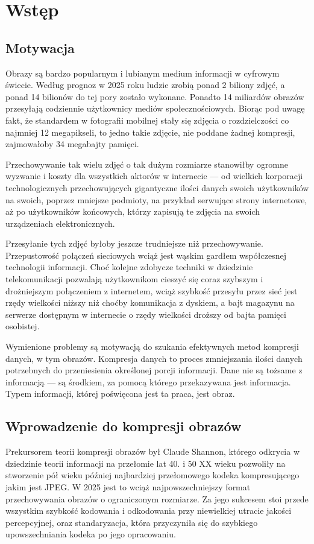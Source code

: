 \clearpage
\section{Wstęp}
\subsection{Motywacja}
Obrazy są bardzo popularnym i lubianym medium informacji w cyfrowym świecie. Według prognoz w 2025 roku ludzie zrobią ponad 2 biliony zdjęć, a ponad 14 bilionów do tej pory zostało wykonane. Ponadto 14 miliardów obrazów przesyłają codziennie użytkownicy mediów społecznościowych. Biorąc pod uwagę fakt, że standardem w fotografii mobilnej stały się zdjęcia o rozdzielczości co najmniej 12 megapikseli, to jedno takie zdjęcie, nie poddane żadnej kompresji, zajmowałoby 34 megabajty pamięci.

Przechowywanie tak wielu zdjęć o tak dużym rozmiarze stanowiłby ogromne wyzwanie i koszty dla wszystkich aktorów w internecie --- od wielkich korporacji technologicznych przechowujących gigantyczne ilości danych swoich użytkowników na swoich, poprzez mniejsze podmioty, na przykład serwujące strony internetowe, aż po użytkowników końcowych, którzy zapisują te zdjęcia na swoich urządzeniach elektronicznych.

Przesyłanie tych zdjęć byłoby jeszcze trudniejsze niż przechowywanie. Przepustowość połączeń sieciowych wciąż jest wąskim gardłem współczesnej technologii informacji. Choć kolejne zdobycze techniki w dziedzinie telekomunikacji pozwalają użytkownikom cieszyć się coraz szybszym i drożniejszym połączeniem z internetem, wciąż szybkość przesyłu przez sieć jest rzędy wielkości niższy niż choćby komunikacja z dyskiem, a bajt magazynu na serwerze dostępnym w internecie o rzędy wielkości droższy od bajta pamięci osobistej. 

Wymienione problemy są motywacją do szukania efektywnych metod kompresji danych, w tym obrazów. Kompresja danych to proces zmniejszania ilości danych potrzebnych do przeniesienia określonej porcji informacji. Dane nie są tożsame z informacją --- są środkiem, za pomocą którego przekazywana jest informacja. Typem informacji, której poświęcona jest ta praca, jest obraz. 

\subsection{Wprowadzenie do kompresji obrazów}
Prekursorem teorii kompresji obrazów był Claude Shannon, którego odkrycia w dziedzinie teorii informacji na przełomie lat 40. i 50 XX wieku pozwoliły na stworzenie pół wieku później najbardziej przełomowego kodeka kompresującego jakim jest JPEG. W 2025 jest to wciąż najpowszechniejszy format przechowywania obrazów o ograniczonym rozmiarze. Za jego sukcesem stoi przede wszystkim szybkość kodowania i odkodowania przy niewielkiej utracie jakości percepcyjnej, oraz standaryzacja, która przyczyniła się do szybkiego upowszechniania kodeka po jego opracowaniu. 

